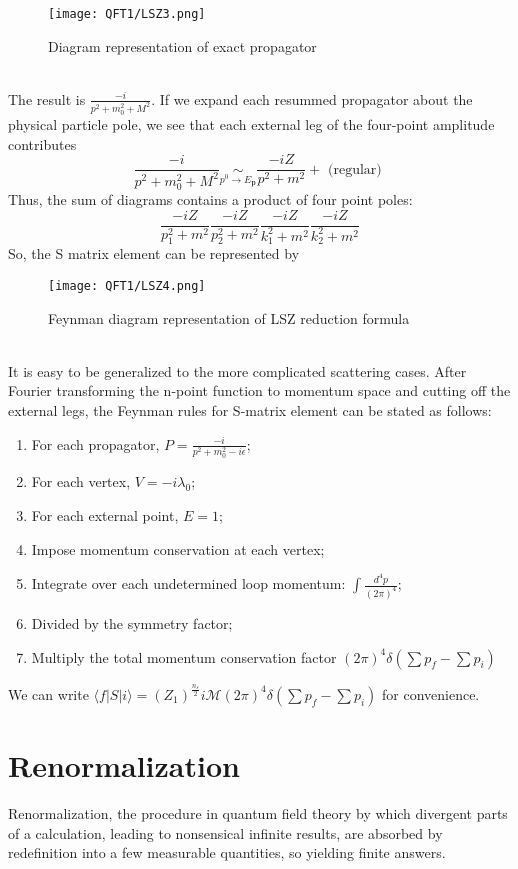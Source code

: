 \begin{figure}[!h]
\centering
\texttt{[image: QFT1/LSZ3.png]}
\caption{Diagram representation of exact propagator}
\end{figure}\\
The result is $\frac{-i}{p^2 + m_0^2 + M^2}$. If we expand each resummed propagator about the physical particle pole, we see that each external leg of the four-point amplitude contributes
\[\frac{-i}{p^2 + m_0^2 + M^2} \underset{p^0 \to E_{\bm{p}}}{\sim} \frac{-iZ}{p^2+m^2} + \mbox{ (regular) }\]
Thus, the sum of diagrams contains a product of four point poles:
\[\frac{-iZ}{p_1^2 + m^2} \frac{-iZ}{p_2^2 + m^2} \frac{-iZ}{k_1^2 + m^2} \frac{-iZ}{k_2^2 + m^2}\]
So, the S matrix element can be represented by 
\begin{figure}[!h]
\centering
\texttt{[image: QFT1/LSZ4.png]}
\caption{Feynman diagram representation of LSZ reduction formula}
\end{figure}
\\
It is easy to be generalized to the more complicated scattering cases. After Fourier transforming the n-point function to momentum space and cutting off the external legs, the Feynman rules for S-matrix element can be stated as follows:
\begin{enumerate}
\item For each propagator, $P = \frac{-i}{p^2 + m_0^2 -i\epsilon}$;
\item For each vertex, $V = -i\lambda_0$;
\item For each external point, $E=1$;
\item Impose momentum conservation at each vertex;
\item Integrate over each undetermined loop momentum: $\int \frac{d^4p}{(2\pi)^4}$;
\item Divided by the symmetry factor;
\item Multiply the total momentum conservation factor $(2\pi)^4 \delta(\sum p_f - \sum p_i)$ 
\end{enumerate}
We can write $\langle f | S | i \rangle = (Z_1)^{\frac{n_s}{2}} i \mathcal{M} (2\pi)^4 \delta(\sum p_f - \sum p_i)$ for convenience.

\section{Renormalization}
Renormalization, the procedure in quantum field theory by which divergent parts of a calculation, leading to nonsensical infinite results, are absorbed by redefinition into a few measurable quantities, so yielding finite answers.

